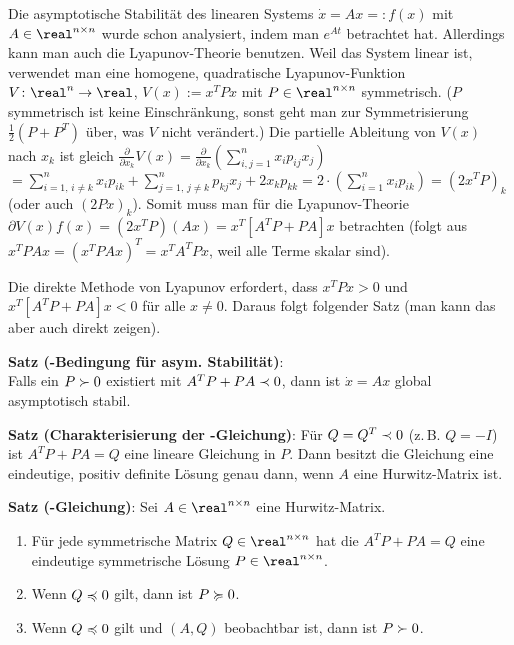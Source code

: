 Die asymptotische Stabilität des linearen Systems $\dot{x} = Ax =: f(x)$ mit
$A \in \real^{n \times n}$ wurde schon analysiert, indem man $e^{At}$ betrachtet hat.
Allerdings kann man auch die Lyapunov-Theorie benutzen.
Weil das System linear ist, verwendet man eine homogene, quadratische Lyapunov-Funktion
$V\colon \real^n \rightarrow \real$, $V(x) := x^T Px$ mit $P \in \real^{n \times n}$
symmetrisch.
($P$ symmetrisch ist keine Einschränkung, sonst geht man zur Symmetrisierung
$\frac{1}{2} (P + P^T)$ über, was $V$ nicht verändert.)
Die partielle Ableitung von $V(x)$ nach $x_k$ ist gleich
$\frac{\partial}{\partial x_k} V(x)
= \frac{\partial}{\partial x_k} (\sum_{i,j=1}^n x_i p_{ij} x_j)$\\
$= \sum_{i=1,\,i\not=k}^n x_i p_{ik} + \sum_{j=1,\,j\not=k}^n p_{kj} x_j + 2 x_k p_{kk}
= 2 \cdot (\sum_{i=1}^n x_i p_{ik})
= (2 x^T P)_k$
(oder auch $(2Px)_k$).
Somit muss man für die Lyapunov-Theorie
$\partial V(x) f(x) = (2 x^T P) (Ax) = x^T [A^T P + PA] x$ betrachten
(folgt aus $x^T P Ax = (x^T P Ax)^T = x^T A^T P x$,
weil alle Terme skalar sind).

\linie

Die direkte Methode von Lyapunov erfordert, dass $x^T P x > 0$ und
$x^T [A^T P + PA] x < 0$ für alle $x \not= 0$.
Daraus folgt folgender Satz
(man kann das aber auch direkt zeigen).

\textbf{Satz (-Bedingung für asym. Stabilität)}:\\
Falls ein $P \succ 0$ existiert mit $A^T P + PA \prec 0$, dann ist
$\dot{x} = Ax$ global asymptotisch stabil.

\textbf{Satz (Charakterisierung der -Gleichung)}:
Für $Q = Q^T \prec 0$ (z.\,B. $Q = -I$) ist $A^T P + PA = Q$ eine lineare Gleichung in $P$.
Dann besitzt die Gleichung eine eindeutige, positiv definite Lösung genau dann, wenn
$A$ eine Hurwitz-Matrix ist.

\textbf{Satz (-Gleichung)}:
Sei $A \in \real^{n \times n}$ eine Hurwitz-Matrix.
\begin{enumerate}
    \item
    Für jede symmetrische Matrix $Q \in \real^{n \times n}$
    hat die  $A^T P + PA = Q$
    eine eindeutige symmetrische Lösung $P \in \real^{n \times n}$.

    \item
    Wenn $Q \preccurlyeq 0$ gilt, dann ist $P \succcurlyeq 0$.

    \item
    Wenn $Q \preccurlyeq 0$ gilt und $(A, Q)$ beobachtbar ist, dann ist $P \succ 0$.
\end{enumerate}

